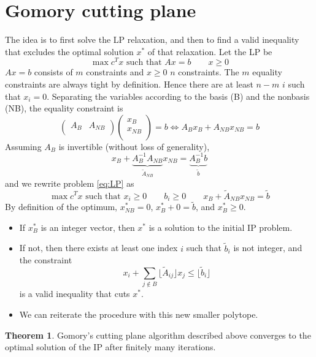 \documentclass[11pt, openany]{report}
\theoremstyle{definition}
\newtheorem{thm}{Theorem}[chapter]
\begin{document}
\section{Gomory cutting plane}
The idea is to first solve the LP relaxation, and then to find a valid inequality that excludes the optimal solution $x^*$ of that relaxation. Let the LP be 
\begin{equation}\label{eq:LP}
    \max c^Tx \text{ such that } Ax=b\qquad x\ge 0
\end{equation}
$Ax=b$ consists of $m$ constraints and $x\ge0$ $n$ constraints. The $m$ equality constraints are always tight by definition. Hence there are at least $n-m$ $i$ such that $x_i=0$. Separating the variables according to the basis (B) and the nonbasis (NB), the equality constraint is 
\begin{equation}
    \begin{pmatrix}
        A_B & A_{NB} \\
    \end{pmatrix} \begin{pmatrix}
        x_B \\ x_{NB}\\
    \end{pmatrix} = b \Longleftrightarrow A_Bx_B + A_{NB}x_{NB} = b
\end{equation}
Assuming $A_B$ is invertible (without loss of generality), 
\begin{equation}
    x_B + \underbrace{A_B^{-1}A_{NB}}_{\tilde A_{NB}} x_{NB} = \underbrace{A_B^{-1}b}_{\tilde b}
\end{equation}
and we rewrite problem \eqref{eq:LP} as 
\begin{equation}
    \max c^Tx \text{ such that } x_i\ge0\qquad b_i\ge 0\qquad x_B + \tilde A_{NB}x_{NB} = \tilde b
\end{equation}
By definition of the optimum, $x_{NB}^* = 0$, $x_B^* + 0 = \tilde b$, and $x_B^* \ge0$. 
\begin{itemize}
    \item If $x_B^*$ is an integer vector, then $x^*$ is a solution to the initial IP problem. 
    \item If not, then there exists at least one index $i$ such that $\tilde b_i$ is not integer, and the constraint 
    \begin{equation}
        x_i + \sum_{j\not \in B} \lfloor \tilde A_{ij}\rfloor x_j \le \lfloor \tilde b_i\rfloor
    \end{equation}
    is a valid inequality that cuts $x^*$. 
    \item We can reiterate the procedure with this new smaller polytope. 
\end{itemize}
\begin{thm}
    Gomory's cutting plane algorithm described above converges to the optimal solution of the IP after finitely many iterations.
\end{thm}
\end{document}
